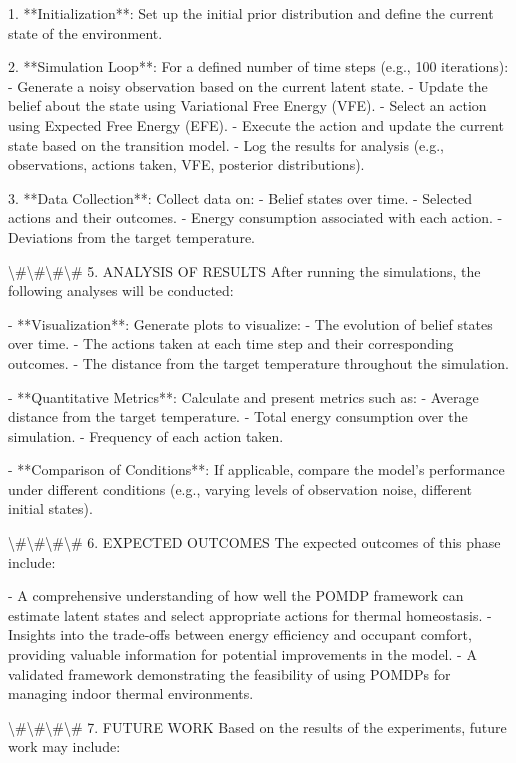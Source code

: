 \documentclass[11pt,a4paper]{article}
\begin{document}
1. **Initialization**: Set up the initial prior distribution and define the current state of the environment.

2. **Simulation Loop**: For a defined number of time steps (e.g., 100 iterations):
   - Generate a noisy observation based on the current latent state.
   - Update the belief about the state using Variational Free Energy (VFE).
   - Select an action using Expected Free Energy (EFE).
   - Execute the action and update the current state based on the transition model.
   - Log the results for analysis (e.g., observations, actions taken, VFE, posterior distributions).

3. **Data Collection**: Collect data on:
   - Belief states over time.
   - Selected actions and their outcomes.
   - Energy consumption associated with each action.
   - Deviations from the target temperature.

\textbackslash{}#\textbackslash{}#\textbackslash{}#\textbackslash{}# 5. ANALYSIS OF RESULTS
After running the simulations, the following analyses will be conducted:

- **Visualization**: Generate plots to visualize:
  - The evolution of belief states over time.
  - The actions taken at each time step and their corresponding outcomes.
  - The distance from the target temperature throughout the simulation.

- **Quantitative Metrics**: Calculate and present metrics such as:
  - Average distance from the target temperature.
  - Total energy consumption over the simulation.
  - Frequency of each action taken.

- **Comparison of Conditions**: If applicable, compare the model's performance under different conditions (e.g., varying levels of observation noise, different initial states).

\textbackslash{}#\textbackslash{}#\textbackslash{}#\textbackslash{}# 6. EXPECTED OUTCOMES
The expected outcomes of this phase include:

- A comprehensive understanding of how well the POMDP framework can estimate latent states and select appropriate actions for thermal homeostasis.
- Insights into the trade-offs between energy efficiency and occupant comfort, providing valuable information for potential improvements in the model.
- A validated framework demonstrating the feasibility of using POMDPs for managing indoor thermal environments.

\textbackslash{}#\textbackslash{}#\textbackslash{}#\textbackslash{}# 7. FUTURE WORK
Based on the results of the experiments, future work may include:
\end{document}
